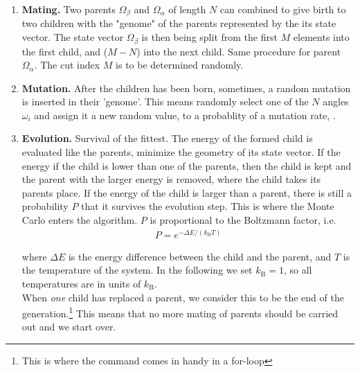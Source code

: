 \documentclass{article}
\begin{document}
\begin{enumerate}
  \item {\bf Mating.}\newline
    Two parents $\Omega_\beta$ and $\Omega_\alpha$ of length $N$
    can combined to give birth to two children with the "genome" 
    of the parents represented by the its state vector.
    The state vector $\Omega_\beta$ is then being split from the first
    $M$ elements into the first child, and ($M-N$) into the next child.
    Same procedure for parent $\Omega_\alpha$.
    The cut index $M$ is to be determined randomly.

  \item {\bf Mutation.}\newline
    After the children has been born, sometimes, a random mutation is
    inserted in their 'genome'.
    This means randomly select one of the $N$ angles $\omega_i$
    and assign it a new random value, to a probablity
    of a mutation rate, .

  \item {\bf Evolution.} \newline
    Survival of the fittest.
    The energy of the formed child is evaluated like the parents, minimize
    the geometry of its state vector.
    If the energy if the child is lower than one of the parents, then the child
    is kept and the parent with the larger energy is removed,
    where the child takes its parents place.
    If the energy of the child is larger than a parent, there is still a probability $P$
    that it survives the evolution step.      
    This is where the Monte Carlo enters the algorithm.
    $P$ is proportional to the Boltzmann factor, i.e.
    \begin{align}
      P = e^{-\Delta E /(k_\mathrm{B}T)}
    \end{align}

    where $\Delta E$ is the energy difference between the child and the parent,
    and $T$ is the temperature of the system. In the following we set $k_\mathrm{B} = 1$, 
    so all temperatures are in units of  $k_\mathrm{B}$.\\

    When {\em one} child has replaced a parent,
    we consider this to be the end of the generation.\footnote{This is where the  command comes in handy in a for-loop}
    This means that no more mating of parents 
    should be carried out and we start over. 

\end{enumerate}
\end{document}
